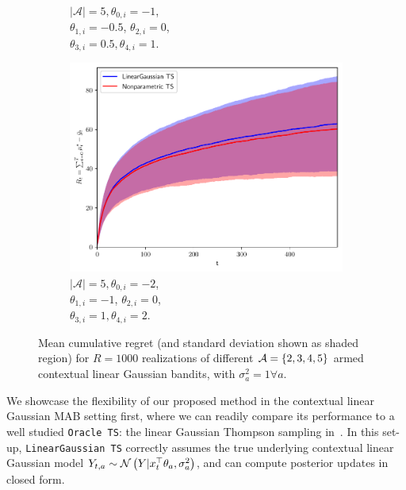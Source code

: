 \begin{figure}[!h]
\begin{subfigure}[b]{0.32\textwidth}
		\vspace*{-5ex}
		\caption{$|\mathcal{A}|=5, \theta_{0,i}=-1$,\\ \hspace*{0.3cm} $\theta_{1,i}=-0.5$, $\theta_{2,i}=0$,\\ \hspace*{0.3cm} $\theta_{3,i}=0.5, \theta_{4,i}=1$.}
		\label{fig:linear_gaussian_A5_05}
	\end{subfigure}
	\begin{subfigure}[b]{0.32\textwidth}
		\includegraphics[width=\textwidth]{./figs/linearGaussian/cumregret_A5_-2_-2_-1_-1_0_0_1_1_2_2_1_1_1_1_1}
		\vspace*{-5ex}
		\caption{$|\mathcal{A}|=5, \theta_{0,i}=-2$,\\ \hspace*{0.3cm} $\theta_{1,i}=-1$, $\theta_{2,i}=0$,\\ \hspace*{0.3cm} $\theta_{3,i}=1, \theta_{4,i}=2$.}
		\label{fig:linear_gaussian_A5_1}
	\end{subfigure}
	\caption{Mean cumulative regret (and standard deviation shown as shaded region) for $R=1000$ realizations of different $\mathcal{A}=\{2,3,4,5\}$ armed contextual linear Gaussian bandits, with $\sigma_a^2=1 \forall a$.}
	\label{fig:linear_gaussian_oracle}
\end{figure}

We showcase the flexibility of our proposed method in the contextual linear Gaussian MAB setting first, where we can readily compare its performance to a well studied \texttt{Oracle TS}: \ie the linear Gaussian Thompson sampling in~\cite{ip-Agrawal2013a}.
In this set-up, \texttt{LinearGaussian TS} correctly assumes the true underlying contextual linear Gaussian model $Y_{t,a}\sim \mathcal{N}\left( Y|x_t^\top\theta_a, \sigma_a^2\right)$, and can compute posterior updates in closed form. 

